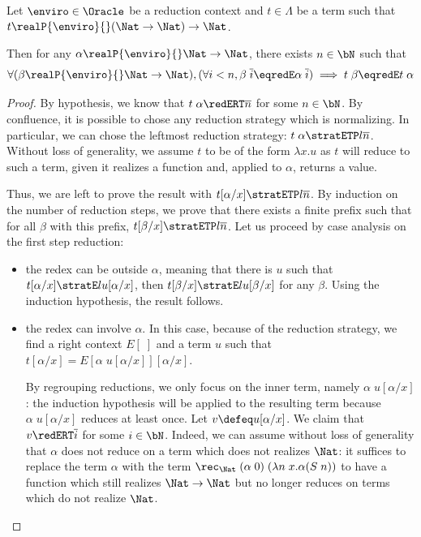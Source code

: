\begin{lemma}[Continuity]
  Let $\enviro\in\Oracle$ be a reduction context and $t \in \Lambda$ be a term such that
  $t \realP{\enviro}{} (\Nat \to \Nat) \to \Nat$.
  
  Then for any $\alpha \realP{\enviro}{} \Nat \to \Nat$, there exists $n\in \bN$ such that
  \[\forall (\beta \realP{\enviro}{} \Nat \to \Nat), (\forall i < n, \beta\;\overline i \eqredE \alpha\;\overline i) \implies t\;\beta \eqredE t\;\alpha\]
\end{lemma}
\endgroup
\begin{proof}%
  By hypothesis, we know that $t\;\alpha \redERT \overline n$ for some $n \in \bN$. By confluence, it is possible to chose any reduction strategy which is normalizing. In particular, we can chose the leftmost reduction strategy:
  $t\;\alpha \stratETP l \overline n$.
  Without loss of generality, we assume $t$ to be of the form $\lambda x.u$ as $t$ will reduce to such a term, given it realizes a function and, applied to $\alpha$, returns a value.

  Thus, we are left to prove the result with $t[\alpha/x] \stratETP l \overline n$. By induction on the number of reduction steps, we prove that there exists a finite prefix such that for all $\beta$ with this prefix, $t[\beta/x] \stratETP l \overline n$. Let us proceed by case analysis on the first step reduction:
  \begin{itemize}
  \item the redex can be outside $\alpha$, meaning that there is $u$ such that $t[\alpha/x] \stratE l u[\alpha/x]$, then $t[\beta/x] \stratE l u[\beta/x]$ for any $\beta$. Using the induction hypothesis, the result follows.
  \item the redex can involve $\alpha$. In this case, because of the reduction strategy, we find a right context $E[\;]$ and a term $u$ such that
    $t[\alpha/x] = E[\alpha\;u[\alpha/x]][\alpha/x]$.
    
    By regrouping reductions, we only focus on the inner term, namely $\alpha\;u[\alpha/x]$: the induction hypothesis will be applied to the resulting term because $\alpha\;u[\alpha/x]$ reduces at least once. Let $v \defeq u[\alpha/x]$.
    We claim that $v \redERT \overline i$ for some $i \in \bN$. Indeed, we can assume without loss of generality that $\alpha$ does not reduce on a term which does not realizes $\Nat$: it suffices to replace the term $\alpha$ with the term
    $\rec_{\Nat}\;(\alpha\;0)\;(\lambda n\;x. \alpha(S\;n))$
    to have a function which still realizes $\Nat \to \Nat$ but no longer reduces on terms which do not realize $\Nat$.


\end{itemize}
\end{proof}
